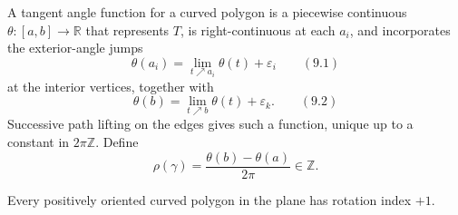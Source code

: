 A tangent angle function for a curved polygon is a piecewise continuous
$\theta\colon[a,b]\to\mathbb R$ that represents $T$, is right-continuous at
each $a_i$, and incorporates the exterior-angle jumps
\[
\theta(a_i)=\lim_{t\nearrow a_i}\theta(t)+\varepsilon_i
\qquad (9.1)
\]
at the interior vertices, together with
\[
\theta(b)=\lim_{t\nearrow b}\theta(t)+\varepsilon_k.
\qquad (9.2)
\]
Successive path lifting on the edges gives such a function, unique up to a
constant in $2\pi\mathbb Z$. Define
\[
\rho(\gamma)=\frac{\theta(b)-\theta(a)}{2\pi}\in\mathbb Z.
\]

\begin{theorem}
\label{thm:rotation-index-theorem}
Every positively oriented curved polygon in the plane has rotation index
$+1$.
\end{theorem}

